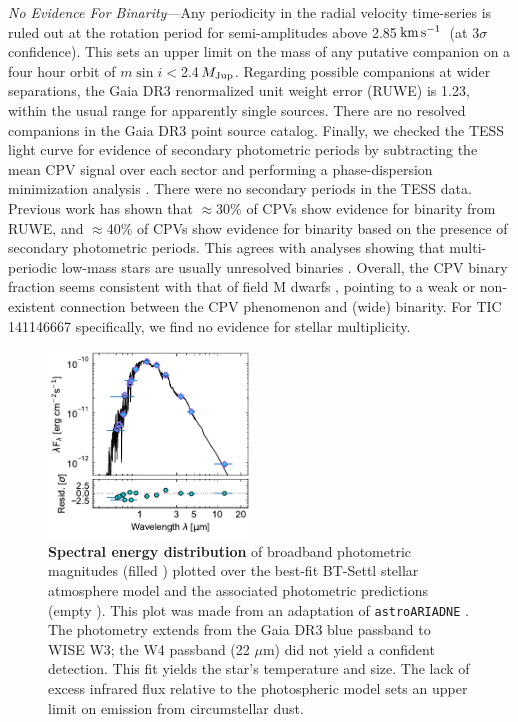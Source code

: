 \documentclass[11pt,twocolumn,tighten,linenumbers]{aastex7}
\newcommand{\kms}{\ensuremath{\rm km\,s^{-1}}}
\begin{document}
{\it No Evidence For Binarity}---Any periodicity in the radial
velocity time-series is ruled out at the rotation period for
semi-amplitudes above 2.85\,\kms\ (at 3$\sigma$ confidence).  This
sets an upper limit on the mass of any putative companion on a four
hour orbit of $m \sin i $$<$2.4\,$M_{\rm Jup}$.  Regarding possible
companions at wider separations, the Gaia DR3 renormalized unit weight
error (RUWE) is 1.23, within the usual
range for apparently single sources.  There are no resolved companions
in the Gaia DR3 point source catalog.  Finally, we checked the TESS
light curve for evidence of secondary photometric periods by
subtracting the mean CPV signal over each sector and performing a
phase-dispersion minimization analysis
\citep{Stellingwerf1978,2021zndo...1011188B}.  There were no secondary
periods in the TESS data.  Previous work \citep{Bouma2024} has shown
that $\approx$30\% of CPVs show evidence for binarity from RUWE, and
$\approx$40\% of CPVs show evidence for binarity based on the presence
of secondary photometric periods.  This agrees with analyses showing
that multi-periodic low-mass stars are usually unresolved binaries
\citep{Tokovinin2018}.  Overall, the CPV binary fraction seems
consistent with that of field M dwarfs \citep{Winters2019}, pointing
to a weak or non-existent connection between the CPV phenomenon and
(wide) binarity.  For TIC\,141146667 specifically, we find no
evidence for stellar multiplicity.


\begin{figure}[!t]
  \centering
  \includegraphics[width=0.48\textwidth]{f4.pdf}
  \caption{
    {\bf Spectral energy distribution} of broadband photometric
    magnitudes (filled ) plotted over the best-fit
    BT-Settl stellar atmosphere model \citep{Allard2012} and the
    associated photometric predictions (empty ).  This plot was made from an adaptation of
    \texttt{astroARIADNE} \citep{Vines2022}.  The photometry extends
    from the Gaia DR3 blue passband to WISE W3; the W4 passband (22
    $\mu$m) did not yield a confident detection.  This fit yields the
    star's temperature and size.  The lack of excess infrared flux
    relative to the photospheric model sets an upper limit on emission
    from circumstellar dust.
    }
  \label{fig:sed}
\end{figure}
\end{document}
